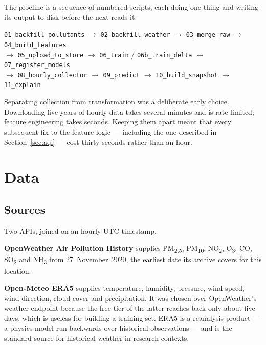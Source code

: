 \documentclass[11pt,a4paper]{article}
\begin{document}
The pipeline is a sequence of numbered scripts, each doing one thing and
writing its output to disk before the next reads it:

\begin{center}
\small
\texttt{01\_backfill\_pollutants} $\rightarrow$
\texttt{02\_backfill\_weather} $\rightarrow$
\texttt{03\_merge\_raw} $\rightarrow$
\texttt{04\_build\_features} \\[3pt]
$\rightarrow$ \texttt{05\_upload\_to\_store} $\rightarrow$
\texttt{06\_train} / \texttt{06b\_train\_delta} $\rightarrow$
\texttt{07\_register\_models} \\[3pt]
$\rightarrow$ \texttt{08\_hourly\_collector} $\rightarrow$
\texttt{09\_predict} $\rightarrow$
\texttt{10\_build\_snapshot} $\rightarrow$
\texttt{11\_explain}
\end{center}

Separating collection from transformation was a deliberate early choice.
Downloading five years of hourly data takes several minutes and is
rate-limited; feature engineering takes seconds. Keeping them apart
meant that every subsequent fix to the feature logic --- including the
one described in Section~\ref{sec:aqi} --- cost thirty seconds rather
than an hour.

\section{Data}

\subsection{Sources}

Two APIs, joined on an hourly UTC timestamp.

\textbf{OpenWeather Air Pollution History} supplies PM\textsubscript{2.5},
PM\textsubscript{10}, NO\textsubscript{2}, O\textsubscript{3}, CO,
SO\textsubscript{2} and NH\textsubscript{3} from 27~November~2020, the
earliest date its archive covers for this location.

\textbf{Open-Meteo ERA5} supplies temperature, humidity, pressure, wind
speed, wind direction, cloud cover and precipitation. It was chosen over
OpenWeather's weather endpoint because the free tier of the latter
reaches back only about five days, which is useless for building a
training set. ERA5 is a reanalysis product --- a physics model run
backwards over historical observations --- and is the standard source
for historical weather in research contexts.
\end{document}
